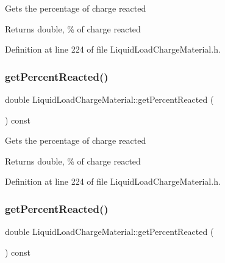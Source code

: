 Gets the percentage of charge reacted \begin{DoxyReturn}{Returns}
double, \% of charge reacted 
\end{DoxyReturn}


Definition at line 224 of file Liquid\+Load\+Charge\+Material.\+h.

\mbox{\label{class_liquid_load_charge_material_acfedb26800cbead9bf11c57e1356dd57}} 
\subsubsection{\texorpdfstring{get\+Percent\+Reacted()}{getPercentReacted()}\hspace{0.1cm}{\footnotesize\ttfamily [2/3]}}
{\footnotesize\ttfamily double Liquid\+Load\+Charge\+Material\+::get\+Percent\+Reacted (\begin{DoxyParamCaption}{ }\end{DoxyParamCaption}) const\hspace{0.3cm}{\ttfamily [inline]}}

Gets the percentage of charge reacted \begin{DoxyReturn}{Returns}
double, \% of charge reacted 
\end{DoxyReturn}


Definition at line 224 of file Liquid\+Load\+Charge\+Material.\+h.

\mbox{\label{class_liquid_load_charge_material_acfedb26800cbead9bf11c57e1356dd57}} 
\subsubsection{\texorpdfstring{get\+Percent\+Reacted()}{getPercentReacted()}\hspace{0.1cm}{\footnotesize\ttfamily [3/3]}}
{\footnotesize\ttfamily double Liquid\+Load\+Charge\+Material\+::get\+Percent\+Reacted (\begin{DoxyParamCaption}{ }\end{DoxyParamCaption}) const\hspace{0.3cm}{\ttfamily [inline]}}

